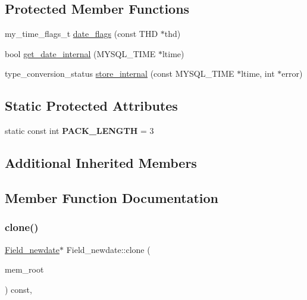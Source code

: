 \subsection*{Protected Member Functions}
\begin{DoxyCompactItemize}
\item 
my\+\_\+time\+\_\+flags\+\_\+t \mbox{\hyperlink{classField__newdate_af680898e732203af05d7254e37633d71}{date\+\_\+flags}} (const T\+HD $\ast$thd)
\item 
bool \mbox{\hyperlink{classField__newdate_a108e583a4ec9f51e7f1a28d179b3b725}{get\+\_\+date\+\_\+internal}} (M\+Y\+S\+Q\+L\+\_\+\+T\+I\+ME $\ast$ltime)
\item 
type\+\_\+conversion\+\_\+status \mbox{\hyperlink{classField__newdate_a9b619622de655b7f82a85052854a2395}{store\+\_\+internal}} (const M\+Y\+S\+Q\+L\+\_\+\+T\+I\+ME $\ast$ltime, int $\ast$error)
\end{DoxyCompactItemize}
\subsection*{Static Protected Attributes}
\begin{DoxyCompactItemize}
\item 
\mbox{\label{classField__newdate_a1c80b2495cf30d476b45114e75c56819}} 
static const int {\bfseries P\+A\+C\+K\+\_\+\+L\+E\+N\+G\+TH} = 3
\end{DoxyCompactItemize}
\subsection*{Additional Inherited Members}


\subsection{Member Function Documentation}
\mbox{\label{classField__newdate_a638bea89f424025554d5d173a5622eaf}} 
\subsubsection{\texorpdfstring{clone()}{clone()}\hspace{0.1cm}{\footnotesize\ttfamily [1/2]}}
{\footnotesize\ttfamily \mbox{\hyperlink{classField__newdate}{Field\+\_\+newdate}}$\ast$ Field\+\_\+newdate\+::clone (\begin{DoxyParamCaption}\item[{M\+E\+M\+\_\+\+R\+O\+OT $\ast$}]{mem\+\_\+root }\end{DoxyParamCaption}) const\hspace{0.3cm}{\ttfamily [inline]}, {\ttfamily [virtual]}}

